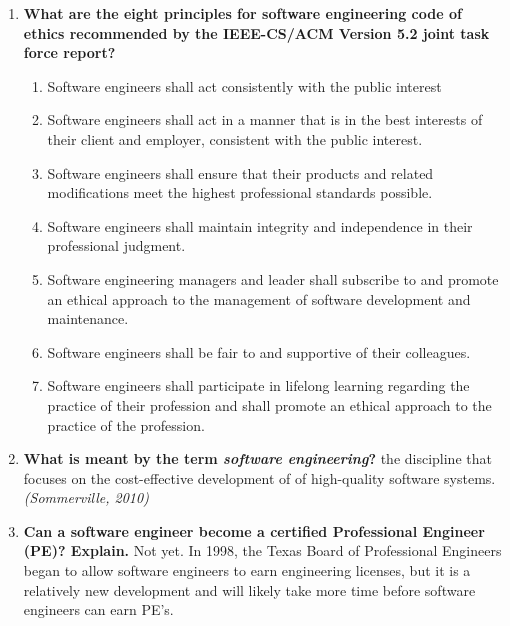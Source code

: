 \documentclass[11pt]{article}
\begin{document}
\begin{enumerate}
    \item \textbf{What are the eight principles for software engineering code of ethics recommended by the IEEE-CS/ACM Version 5.2 joint task force report?}
    \begin{enumerate}
        \item Software engineers shall act consistently with the public interest
        \item Software engineers shall act in a manner that is in the best interests of their client and employer, consistent with the public interest. 
        \item Software engineers shall ensure that their products and related modifications meet the highest professional standards possible. 
        \item Software engineers shall maintain integrity and independence in their professional judgment. 
        \item Software engineering managers and leader shall subscribe to and promote an ethical approach to the management of software development and maintenance. 
        \item Software engineers shall be fair to and supportive of their colleagues.
        \item Software engineers shall participate in lifelong learning regarding the practice of their profession and shall promote an ethical approach to the practice of the profession. 
    \end{enumerate}
    
    \item \textbf{What is meant by the term \textit{software engineering}?}
    \newline
    the discipline that focuses on the cost-effective development of of high-quality software systems. \textit{(Sommerville, 2010)}
    
    \item \textbf{Can a software engineer become a certified Professional Engineer (PE)? Explain.}
    \newline
    Not yet. In 1998, the Texas Board of Professional Engineers began to allow software engineers to earn engineering licenses, but it is a relatively new development and will likely take more time before software engineers can earn PE's. 
\end{enumerate}
\end{document}
